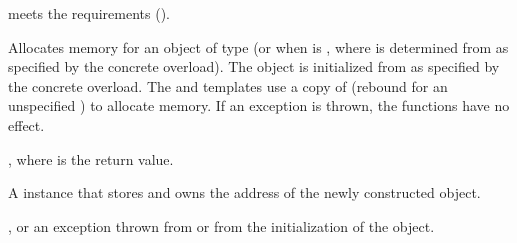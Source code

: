\begin{itemdescr}
\pnum
\expects
{} meets the  requirements ().

\pnum
\effects
Allocates memory for an object of type 
(or  when  is ,
where  is determined from  as specified by the concrete overload).
The object is initialized from  as specified by the concrete overload.
The  and  templates
use a copy of 
(rebound for an unspecified ) to allocate memory.
If an exception is thrown, the functions have no effect.

\pnum
\ensures
{},
where  is the return value.

\pnum
\returns
A  instance that stores and owns the address of
the newly constructed object.

\pnum
\throws
{}, or
an exception thrown from  or from the initialization of the object.


\end{itemdescr}
